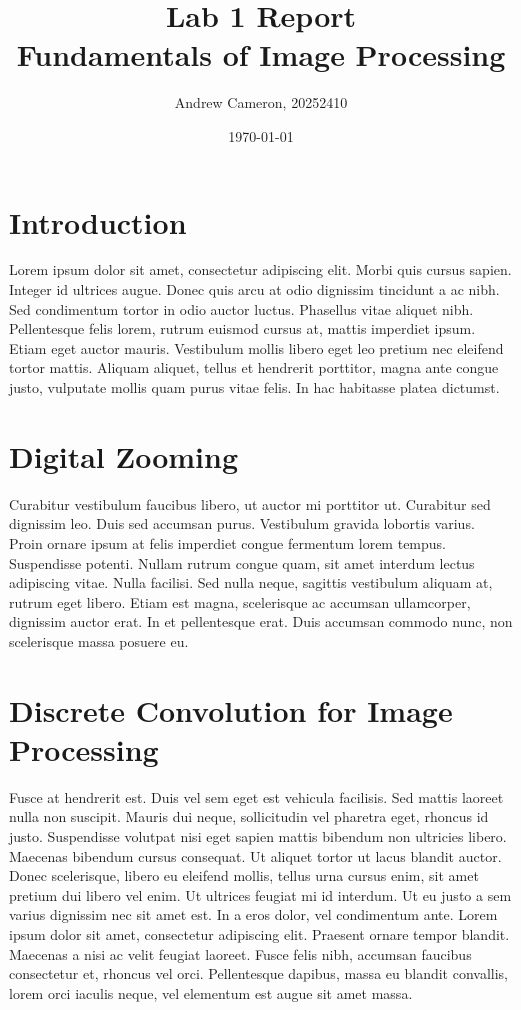 \documentclass{sydeStyle}
\title{Lab 1 Report\\
Fundamentals of Image Processing}
\date{\today}
\author{Andrew Cameron, 20252410}
\begin{document}
\maketitle

\section*{Introduction}
Lorem ipsum dolor sit amet, consectetur adipiscing elit. Morbi quis cursus
sapien. Integer id ultrices augue. Donec quis arcu at odio dignissim
tincidunt a ac nibh. Sed condimentum tortor in odio auctor luctus.
Phasellus vitae aliquet nibh. Pellentesque felis lorem, rutrum euismod
cursus at, mattis imperdiet ipsum. Etiam eget auctor mauris. Vestibulum
mollis libero eget leo pretium nec eleifend tortor mattis. Aliquam aliquet,
tellus et hendrerit porttitor, magna ante congue justo, vulputate mollis
quam purus vitae felis. In hac habitasse platea dictumst.

\section*{Digital Zooming}
Curabitur vestibulum faucibus libero, ut auctor mi porttitor ut. Curabitur
sed dignissim leo. Duis sed accumsan purus. Vestibulum gravida lobortis
varius. Proin ornare ipsum at felis imperdiet congue fermentum lorem
tempus. Suspendisse potenti. Nullam rutrum congue quam, sit amet interdum
lectus adipiscing vitae. Nulla facilisi. Sed nulla neque, sagittis
vestibulum aliquam at, rutrum eget libero. Etiam est magna, scelerisque
ac accumsan ullamcorper, dignissim auctor erat. In et pellentesque erat.
Duis accumsan commodo nunc, non scelerisque massa posuere eu.

\section*{Discrete Convolution for Image Processing}
Fusce at hendrerit est. Duis vel sem eget est vehicula facilisis. Sed
mattis laoreet nulla non suscipit. Mauris dui neque, sollicitudin vel
pharetra eget, rhoncus id justo. Suspendisse volutpat nisi eget sapien
mattis bibendum non ultricies libero. Maecenas bibendum cursus consequat.
Ut aliquet tortor ut lacus blandit auctor. Donec scelerisque, libero eu
eleifend mollis, tellus urna cursus enim, sit amet pretium dui libero vel
enim. Ut ultrices feugiat mi id interdum. Ut eu justo a sem varius
dignissim nec sit amet est. In a eros dolor, vel condimentum ante. Lorem
ipsum dolor sit amet, consectetur adipiscing elit. Praesent ornare tempor
blandit. Maecenas a nisi ac velit feugiat laoreet. Fusce felis nibh,
accumsan faucibus consectetur et, rhoncus vel orci. Pellentesque dapibus,
massa eu blandit convallis, lorem orci iaculis neque, vel elementum est
augue sit amet massa.
\end{document}
